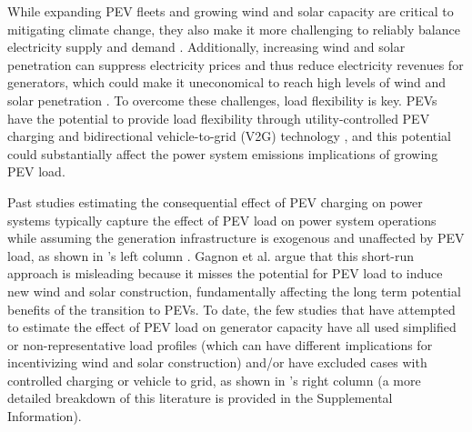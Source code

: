\documentclass[9pt,twocolumn,twoside,lineno]{pnas-new}
\begin{document}
While expanding PEV fleets and growing wind and solar capacity are critical to mitigating climate change, they also make it more challenging to reliably balance electricity supply and demand \cite{wiser_impacts_2017,chen_impacts_2018,weis_consequential_2016}. Additionally, increasing wind and solar penetration can suppress electricity prices and thus reduce electricity revenues for generators, which could make it uneconomical to reach high levels of wind and solar penetration \cite{mills_impacts_2020,das_learning_2020,craig_retrospective_2018}. To overcome these challenges, load flexibility is key. PEVs have the potential to provide load flexibility through utility-controlled PEV charging and bidirectional vehicle-to-grid (V2G) technology \cite{bird_wind_2014,jones_renewable_2017,kroposki_achieving_2017,impram_challenges_2020,mai_getting_2022}, and this potential could substantially affect the power system emissions implications of growing PEV load. %

Past studies estimating the consequential effect of PEV charging on power systems typically capture the effect of PEV load on power system operations while assuming the generation infrastructure is exogenous and unaffected by PEV load, as shown in 's left column \cite{tarroja_assessing_2016,nunes_displacing_2017,forrest_charging_2016,weis_emissions_2015,bruchon_cleaning_2024,holland_are_2016,holland_distributional_2019,holland_decompositions_2020,holland_why_2022,tu_electric_2020,wang_value_2021, shi_integration_2020,ryan_comparative_2016}. Gagnon et al. \citep{gagnon_short-run_2022} argue that this short-run approach is misleading because it misses the potential for PEV load to induce new wind and solar construction, fundamentally affecting the long term potential benefits of the transition to PEVs. To date, the few studies that have attempted to estimate the effect of PEV load on generator capacity have all used simplified or non-representative load profiles (which can have different implications for incentivizing wind and solar construction) and/or have excluded cases with controlled charging or vehicle to grid, as shown in 's right column \cite{brown_synergies_2018, owens_can_2022, manriquez_impact_2020,weis_estimating_2014,nopmongcol_air_2017,sheppard_private_2021,gagnon_planning_2022,jenn_emissions_2023,holland_regularization_2024} (a more detailed breakdown of this literature is provided in the Supplemental Information). 
\end{document}
